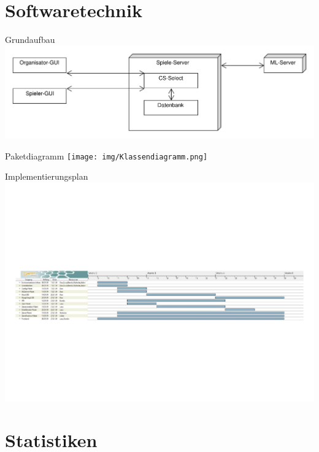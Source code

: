 \documentclass[xcolor=dvipsnames]{beamer}
\begin{document}
    \renewcommand{\arraystretch}{1.5}

	\section{Softwaretechnik}
	\begin{frame}{Grundaufbau}
	\centering
	\includegraphics[width=\textwidth]{img/Architektur.pdf}
	\end{frame}

	\begin{frame}{Paketdiagramm}
	\centering
	\texttt{[image: img/Klassendiagramm.png]}
	\end{frame}

	\begin{frame}{Implementierungsplan}
	\includegraphics[width=1.15\textwidth]{img/gantt.pdf}
	\end{frame}
	
    \section{Statistiken}
    
\end{document}
